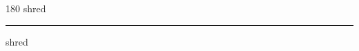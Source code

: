 
\begin{frame}
\begin{center}
\begin{turn}{180}
{\fontsize{2.5cm}{1em}\selectfont shred}
\end{turn}
\vspace{1em}\par  
\hrule
\vspace{1em}\par  
{\fontsize{2.5cm}{1em}\selectfont shred}
\end{center}
\end{frame}
